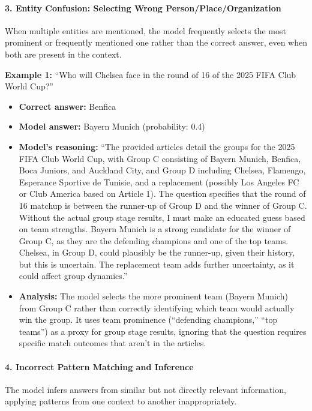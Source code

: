 \documentclass{article} %
\begin{document}
\paragraph{3. Entity Confusion: Selecting Wrong Person/Place/Organization}

When multiple entities are mentioned, the model frequently selects the most prominent or frequently mentioned one rather than the correct answer, even when both are present in the context.


\textbf{Example 1:} ``Who will Chelsea face in the round of 16 of the 2025 FIFA Club World Cup?''

\begin{itemize}
\item \textbf{Correct answer:} Benfica
\item \textbf{Model answer:} Bayern Munich (probability: 0.4)
\item \textbf{Model's reasoning:} ``The provided articles detail the groups for the 2025 FIFA Club World Cup, with Group C consisting of Bayern Munich, Benfica, Boca Juniors, and Auckland City, and Group D including Chelsea, Flamengo, Esperance Sportive de Tunisie, and a replacement (possibly Los Angeles FC or Club America based on Article 1). The question specifies that the round of 16 matchup is between the runner-up of Group D and the winner of Group C. Without the actual group stage results, I must make an educated guess based on team strengths. Bayern Munich is a strong candidate for the winner of Group C, as they are the defending champions and one of the top teams. Chelsea, in Group D, could plausibly be the runner-up, given their history, but this is uncertain. The replacement team adds further uncertainty, as it could affect group dynamics.''
\item \textbf{Analysis:} The model selects the more prominent team (Bayern Munich) from Group C rather than correctly identifying which team would actually win the group. It uses team prominence (``defending champions,'' ``top teams'') as a proxy for group stage results, ignoring that the question requires specific match outcomes that aren't in the articles.
\end{itemize}

\iffalse 
\paragraph{4. Incorrect Pattern Matching and Inference}

The model infers answers from similar but not directly relevant information, applying patterns from one context to another inappropriately.
\end{document}
